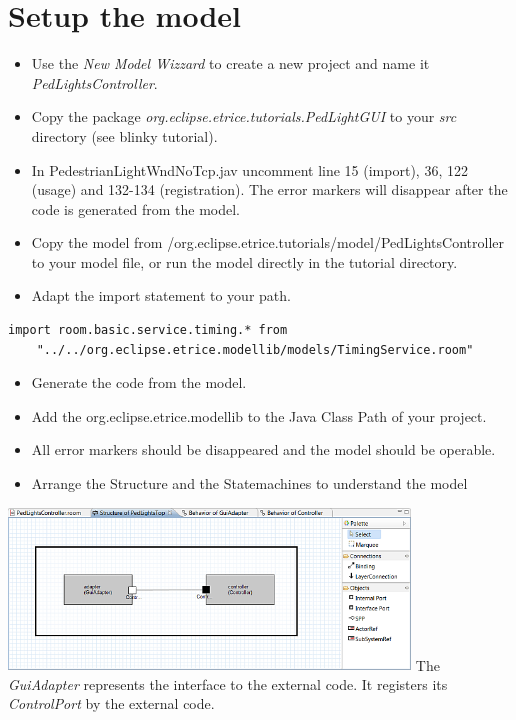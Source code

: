 \section{Setup the model}

\begin{itemize}
\item Use the \textit{New Model Wizzard} to create a new \eTrice{} project and name it 
\textit{PedLightsController}.
\item Copy the package \textit{org.eclipse.etrice.tutorials.PedLightGUI} to your \textit{src} directory 
(see blinky tutorial).
\item In PedestrianLightWndNoTcp.jav uncomment line 15 (import), 36, 122 (usage) and 132-134 
(registration). The error markers will disappear after the code is generated from the model.
\item \begin{flushleft}Copy the model from /org.eclipse.etrice.tutorials/model/PedLightsController to your 
model file, or run the model directly in the tutorial directory.\end{flushleft} 
\item Adapt the import statement to your path.
\end{itemize}

\begin{small}
\begin{verbatim} 
import room.basic.service.timing.* from 
	"../../org.eclipse.etrice.modellib/models/TimingService.room" 
\end{verbatim}
\end{small}

\begin{itemize}
\item Generate the code from the model.
\item Add the org.eclipse.etrice.modellib to the Java Class Path of your project.
\item All error markers should be disappeared and the model should be operable. 
\item Arrange the Structure and the Statemachines to understand the model
\end{itemize}

\includegraphics[width=0.8\textwidth]{images/030-PedLights01.png}
The \textit{GuiAdapter} represents the interface to the external code. It registers its 
\textit{ControlPort} by the external code.

